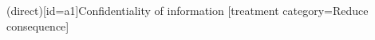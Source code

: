 \documentclass{article}
\begin{document}
\begin{corastreatmentdiagram}[mode=overview]
  \asset(direct)[id=a1]{Confidentiality of information}
  [treatment category={Reduce consequence}]
\end{corastreatmentdiagram}
\end{document}
